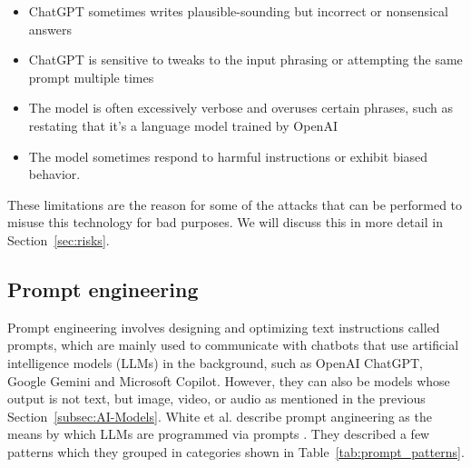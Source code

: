 \begin{itemize}
    \item ChatGPT sometimes writes plausible-sounding but incorrect or nonsensical answers
    \item ChatGPT is sensitive to tweaks to the input phrasing or attempting the same prompt multiple times
    \item The model is often excessively verbose and overuses certain phrases, such as restating that it’s a language model trained by OpenAI
    \item The model sometimes respond to harmful instructions or exhibit biased behavior.
\end{itemize}

These limitations are the reason for some of the attacks that can be performed to misuse this technology for bad purposes. We will discuss this in more detail in Section~\ref{sec:risks}.


\subsection{Prompt engineering}
Prompt engineering involves designing and optimizing text instructions called prompts, which are mainly used to communicate with chatbots that use artificial intelligence models (LLMs) in the background, such as OpenAI ChatGPT, Google Gemini and Microsoft Copilot. However, they can also be models whose output is not text, but image, video, or audio as mentioned in the previous Section~\ref{subsec:AI-Models}. White et al. describe prompt angineering as the means by which LLMs are programmed via prompts \cite{white2023promptpatterncatalogenhance}. They described a few patterns which they grouped in categories shown in Table~\ref{tab:prompt_patterns}.

